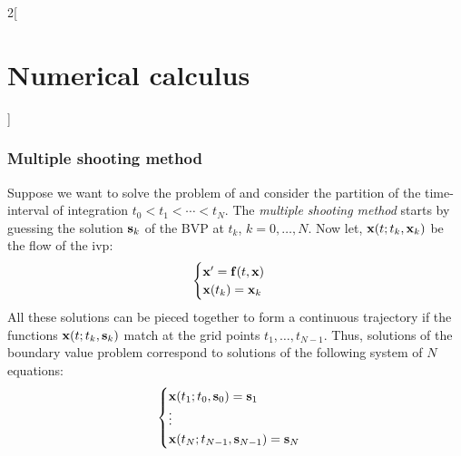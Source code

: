 \documentclass[../../../main_math.tex]{subfiles}
\begin{document}
\begin{multicols}{2}[\section{Numerical calculus}]
  \subsubsection{Multiple shooting method}
  \begin{definition}
    Suppose we want to solve the problem of  and consider the partition of the time-interval of integration $t_0<t_1<\cdots<t_N$. The \emph{multiple shooting method} starts by guessing the solution $\boldsymbol{\mathrm{s}}_k$ of the BVP at $t_k$, $k=0,\ldots,N$. Now let, $\boldsymbol{\mathrm{x}}(t;t_k,\boldsymbol{\mathrm{x}}_k)$ be the flow of the ivp:
    \begin{equation*}
      \begin{cases}
        \boldsymbol{\mathrm{x}}' =\boldsymbol{\mathrm{f}}(t, \boldsymbol{\mathrm{x}}) \\
        \boldsymbol{\mathrm{x}}(t_k)=\boldsymbol{\mathrm{x}}_k
      \end{cases}
    \end{equation*}
    All these solutions can be pieced together to form a continuous trajectory if the functions $\boldsymbol{\mathrm{x}}(t;t_k,\boldsymbol{\mathrm{s}}_k)$ match at the grid points $t_1, \ldots, t_{N-1}$. Thus, solutions of the boundary value problem correspond to solutions of the following system of $N$ equations:
    $$
      \begin{cases}
        \boldsymbol{\mathrm{x}}(t_1;t_0,\boldsymbol{\mathrm{s}}_0)=\boldsymbol{\mathrm{s}}_1 \\
        \vdots                            \\
        \boldsymbol{\mathrm{x}}(t_N;t_{N-1},\boldsymbol{\mathrm{s}}_{N-1})=\boldsymbol{\mathrm{s}}_N
      \end{cases}
    $$
  \end{definition}

\end{multicols}
\end{document}
